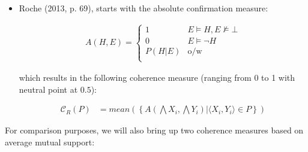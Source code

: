 \documentclass[10pt,]{scrartcl}
\begin{document}
\begin{itemize}



\item  Roche (2013, p. 69), starts with the
absolute confirmation measure:

\begin{align*}
    A(H,E) = \begin{cases}
    1 & E\models H, E\not \models \bot \\
    0 & E \models \neg H\\
    P(H|E) & \mbox{o/w} \\
    \end{cases}
\end{align*}

which results in the following coherence measure (ranging from 0 to 1 with neutral point at $0.5$):

\begin{align}
\tag{Roche}  
    \mathcal{C}_{R}(P) & =
mean\left(\left\{A(\bigwedge X_i, \bigwedge Y_i) | \langle X_i, Y_i\rangle \in P\right\} \right) 
\end{align}



\end{itemize}


For comparison purposes, we will also bring up two coherence measures  based on average mutual support:
\end{document}
